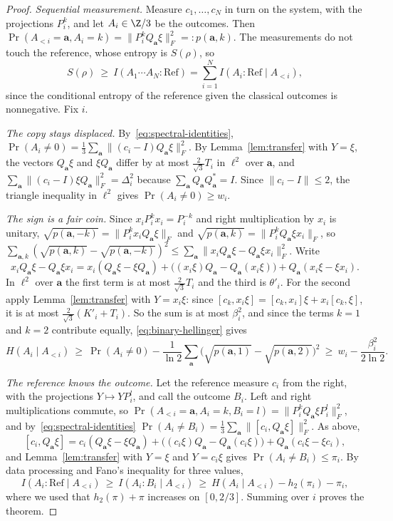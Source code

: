 \begin{proof}
\emph{Sequential measurement.} Measure $c_1,\dots,c_N$ in turn on the system, with the projections $P_i^k$, and let $A_i\in\Z/3$ be the outcomes.
Then $\Pr(A_{<i}=\mathbf a,A_i=k)=\|P_i^kQ_{\mathbf a}\xi\|_F^2=:p(\mathbf a,k)$. The measurements do not touch the reference, whose entropy is
$S(\rho)$, so
\[
S(\rho)\ \ge\ I(A_1\cdots A_N:\mathrm{Ref})=\sum_{i=1}^NI(A_i:\mathrm{Ref}\mid A_{<i}),
\]
since the conditional entropy of the reference given the classical outcomes is nonnegative. Fix $i$.

\emph{The copy stays displaced.} By~\eqref{eq:spectral-identities}, $\Pr(A_i\ne0)=\frac13\sum_{\mathbf a}\|(c_i-I)Q_{\mathbf a}\xi\|_F^2$. By
Lemma~\ref{lem:transfer} with $Y=\xi$, the vectors $Q_{\mathbf a}\xi$ and $\xi Q_{\mathbf a}$ differ by at most $\frac2{\sqrt3}T_i$ in $\ell^2$ over $\mathbf a$,
and $\sum_{\mathbf a}\|(c_i-I)\xi Q_{\mathbf a}\|_F^2=\Delta_i^2$ because $\sum_{\mathbf a}Q_{\mathbf a}Q_{\mathbf a}^*=I$. Since $\|c_i-I\|\le2$, the triangle
inequality in $\ell^2$ gives $\Pr(A_i\ne0)\ge w_i$.

\emph{The sign is a fair coin.} Since $x_iP_i^kx_i=P_i^{-k}$ and right multiplication by $x_i$ is unitary,
$\sqrt{p(\mathbf a,-k)}=\|P_i^kx_iQ_{\mathbf a}\xi\|_F$ and $\sqrt{p(\mathbf a,k)}=\|P_i^kQ_{\mathbf a}\xi x_i\|_F$, so
$\sum_{\mathbf a,k}(\sqrt{p(\mathbf a,k)}-\sqrt{p(\mathbf a,-k)})^2\le\sum_{\mathbf a}\|x_iQ_{\mathbf a}\xi-Q_{\mathbf a}\xi x_i\|_F^2$. Write
\[
x_iQ_{\mathbf a}\xi-Q_{\mathbf a}\xi x_i=x_i(Q_{\mathbf a}\xi-\xi Q_{\mathbf a})+\bigl((x_i\xi)Q_{\mathbf a}-Q_{\mathbf a}(x_i\xi)\bigr)+Q_{\mathbf a}(x_i\xi-\xi x_i).
\]
In $\ell^2$ over $\mathbf a$ the first term is at most $\frac2{\sqrt3}T_i$ and the third is $\theta'_i$. For the second apply Lemma~\ref{lem:transfer} with
$Y=x_i\xi$: since $[c_k,x_i\xi]=[c_k,x_i]\xi+x_i[c_k,\xi]$, it is at most $\frac2{\sqrt3}(K'_i+T_i)$. So the sum is at most $\beta_i^2$, and since the
terms $k=1$ and $k=2$ contribute equally, \eqref{eq:binary-hellinger} gives
\[
H(A_i\mid A_{<i})\ \ge\ \Pr(A_i\ne0)-\frac1{\ln2}\sum_{\mathbf a}\bigl(\sqrt{p(\mathbf a,1)}-\sqrt{p(\mathbf a,2)}\bigr)^2\ \ge\ w_i-\frac{\beta_i^2}{2\ln2}.
\]

\emph{The reference knows the outcome.} Let the reference measure $c_i$ from the right, with the projections $Y\mapsto YP_i^l$, and call the outcome
$B_i$. Left and right multiplications commute, so $\Pr(A_{<i}=\mathbf a,A_i=k,B_i=l)=\|P_i^kQ_{\mathbf a}\xi P_i^l\|_F^2$, and
by~\eqref{eq:spectral-identities} $\Pr(A_i\ne B_i)=\frac13\sum_{\mathbf a}\|[c_i,Q_{\mathbf a}\xi]\|_F^2$. As above,
\[
[c_i,Q_{\mathbf a}\xi]=c_i(Q_{\mathbf a}\xi-\xi Q_{\mathbf a})+\bigl((c_i\xi)Q_{\mathbf a}-Q_{\mathbf a}(c_i\xi)\bigr)+Q_{\mathbf a}(c_i\xi-\xi c_i),
\]
and Lemma~\ref{lem:transfer} with $Y=\xi$ and $Y=c_i\xi$ gives $\Pr(A_i\ne B_i)\le\pi_i$. By data processing and Fano's inequality for three values,
\[
I(A_i:\mathrm{Ref}\mid A_{<i})\ \ge\ I(A_i:B_i\mid A_{<i})\ \ge\ H(A_i\mid A_{<i})-h_2(\pi_i)-\pi_i ,
\]
where we used that $h_2(\pi)+\pi$ increases on $[0,2/3]$. Summing over $i$ proves the theorem.
\end{proof}

